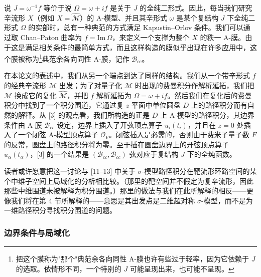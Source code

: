 \documentclass[11pt,a4paper,UTF8]{ctexart}
\theoremstyle{plain}
\theoremstyle{definition}
\begin{document}

说 $J=\omega^{-1}f$ 等价于说 $\Omega=\omega+if$ 是关于 $J$ 的全纯二形式。因此，每当我们研究辛流形 $X$（例如 $X=\widehat{\mathcal{M}}$）的 A-模型、并且其辛形式 $\omega$ 是某个复结构 $J$ 下全纯二形式 $\Omega$ 的实部时，总有一种典范的方式满足 Kapustin--Orlov 条件。我们可以通过取 Chan--Paton 曲率为 $f=\mathrm{Im}\,\Omega$，来定义一个支撑为整个 $X$ 的秩一 A-膜。由于这是满足相关条件的最简单方式，而且这样构造的膜似乎出现在许多应用中，这个膜被称为\footnote{把这个膜称为"那个"典范余各向同性 A-膜也许有些过于轻率，因为它依赖于 $J$ 的选取。依情形不同，一个特别的 $J$ 可能呈现出来，也可能不呈现。}典范余各向同性 A-膜，记作 $\mathcal{B}_{cc}$。

在本论文的表述中，我们从另一个端点到达了同样的结构。我们从一个带辛形式 $f$ 的经典辛流形 $\mathcal{M}$ 出发；为了对量子化 $\mathcal{M}$ 时出现的费曼积分作解析延拓，我们把 $\mathcal{M}$ 换成它的复化 $\widehat{\mathcal{M}}$，并把 $f$ 解析延拓为 $\Omega=\omega+if$。然后我们在复化后的费曼积分中找到了一个积分围道，它通过复 $z$ 平面中单位圆盘 $D$ 上的路径积分而有自然的解释。从 [3] 的观点看，我们所构造的正是 $D$ 上 A-模型的路径积分，其边界条件由 A-膜 $\mathcal{B}_{cc}$ 设定，边界上插入了开弦顶点算子 $u_i(t_i)$，并且在 $z=0$ 处插入了一个闭弦 A-模型顶点算子 $\mathcal{O}_V$。闭弦插入是必需的，否则由于费米子量子数 $F$ 的反常，圆盘上的路径积分将为零。至于插在圆盘边界上的开弦顶点算子 $u_\alpha(t_\alpha)$，[3] 的一个结果是 $(\mathcal{B}_{cc},\mathcal{B}_{cc})$ 弦对应于复结构 $J$ 下的全纯函数。


读者或许愿意把这一讨论与 [11--13] 中关于 $\sigma$-模型路径积分在靶流形环路空间的某个中维子空间上局域化的分析相比较。（那里的靶空间并不假定为复辛流形，因此那些中维围道未被解释为积分围道。）那里的做法与我们在此所解释的相反——更像我们将在第 4 节所解释的——意思是其出发点是二维超对称 $\sigma$-模型，而不是为一维路径积分寻找积分围道的问题。

\subsubsection{边界条件与局域化}
\end{document}
